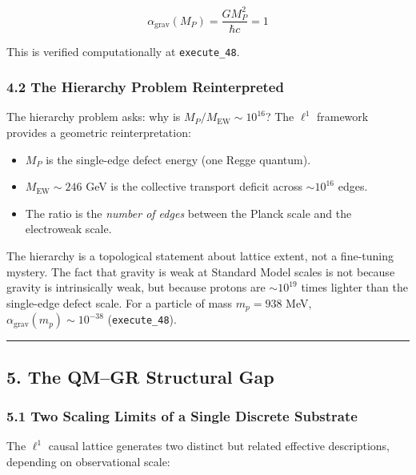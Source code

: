 \documentclass[
]{article}
\providecommand{\tightlist}{%
  \setlength{\itemsep}{0pt}\setlength{\parskip}{0pt}}
\begin{document}
\[\alpha_{\mathrm{grav}}(M_P) = \frac{G M_P^2}{\hbar c} = 1\]

This is verified computationally at \texttt{execute\_48}.

\subsubsection{4.2 The Hierarchy Problem
Reinterpreted}\label{the-hierarchy-problem-reinterpreted}

The hierarchy problem asks: why is
\(M_P / M_{\mathrm{EW}} \sim 10^{16}\)? The \(\ell^1\) framework
provides a geometric reinterpretation:

\begin{itemize}
\tightlist
\item
  \(M_P\) is the single-edge defect energy (one Regge quantum).
\item
  \(M_{\mathrm{EW}} \sim 246\) GeV is the collective transport deficit
  across \(\sim 10^{16}\) edges.
\item
  The ratio is the \emph{number of edges} between the Planck scale and
  the electroweak scale.
\end{itemize}

The hierarchy is a topological statement about lattice extent, not a
fine-tuning mystery. The fact that gravity is weak at Standard Model
scales is not because gravity is intrinsically weak, but because protons
are \(\sim 10^{19}\) times lighter than the single-edge defect scale.
For a particle of mass \(m_p = 938\) MeV,
\(\alpha_{\mathrm{grav}}(m_p) \sim 10^{-38}\) (\texttt{execute\_48}).

\begin{center}\rule{0.5\linewidth}{0.5pt}\end{center}

\subsection{5. The QM--GR Structural Gap}\label{the-qmgr-structural-gap}

\subsubsection{5.1 Two Scaling Limits of a Single Discrete
Substrate}\label{two-scaling-limits-of-a-single-discrete-substrate}

The \(\ell^1\) causal lattice generates two distinct but related
effective descriptions, depending on observational scale:
\end{document}
